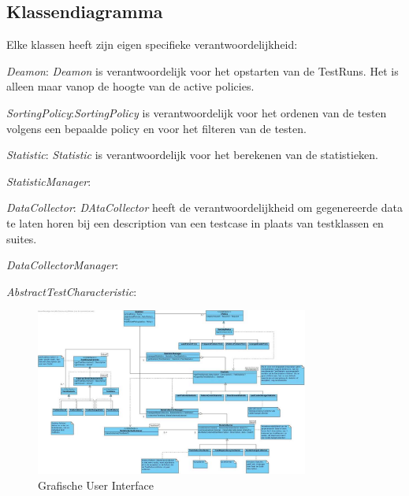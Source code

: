 \documentclass[i1]{oss}
\begin{document}
\subsection{Klassendiagramma}
\label{ssec:Klassendiagramma}

Elke klassen heeft zijn eigen specifieke verantwoordelijkheid:

\begin{description}

\item \textit{Deamon}: \textit{Deamon} is verantwoordelijk voor het opstarten van de TestRuns. Het is alleen maar vanop de hoogte van de active policies.

\item \textit{SortingPolicy}:\textit{SortingPolicy} is verantwoordelijk voor het ordenen van de testen volgens een bepaalde policy en voor het filteren van de testen.

\item \textit{Statistic}: \textit{Statistic} is verantwoordelijk voor het berekenen van de statistieken.

\item \textit{StatisticManager}:

\item \textit{DataCollector}: \textit{DAtaCollector} heeft de verantwoordelijkheid om gegenereerde data te laten horen bij een description van een testcase in plaats van testklassen en suites. 

\item \textit{DataCollectorManager}:

\item \textit{AbstractTestCharacteristic}:



\end{description}


\begin{figure}[tbp]
\begin{center}
    \includegraphics[width=0.8\textwidth]{klassendiagramOud}
    \caption{Grafische User Interface}
	\label{fig:gui}
\end{center}
\end{figure}
\end{document}
